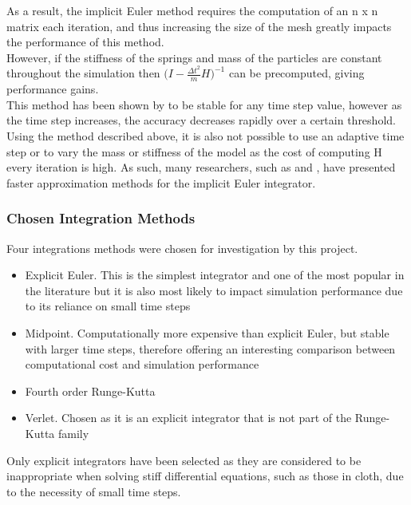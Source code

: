 As a result, the implicit Euler method requires the computation of an n x n matrix each iteration, and thus increasing the size of the mesh greatly impacts the performance of this method.
\\However, if the stiffness of the springs and mass of the particles are constant throughout the simulation then $\bigg(I - \frac{\Delta t^{2}}{m}H\bigg)^{-1}$ can be precomputed, giving performance gains.
\\This method has been shown by \textcite{Volino2001} to be stable for any time step value, however as the time step increases, the accuracy decreases rapidly over a certain threshold. Using the method described above, it is also not possible to use an adaptive time step or to vary the mass or stiffness of the model as the cost of computing H every iteration is high. As such, many researchers, such as \textcite{Mesit2007} and \textcite{Kang2000}, have presented faster approximation methods for the implicit Euler integrator.

\subsubsection{Chosen Integration Methods}
Four integrations methods were chosen for investigation by this project.
\begin{itemize}
\item{Explicit Euler. This is the simplest integrator and one of the most popular in the literature but it is also most likely to impact simulation performance due to its reliance on small time steps}
\item{Midpoint. Computationally more expensive than explicit Euler, but stable with larger time steps, therefore offering an interesting comparison between computational cost and simulation performance}
\item{Fourth order Runge-Kutta}
\item{Verlet. Chosen as it is an explicit integrator that is not part of the Runge-Kutta family}
\end{itemize}
Only explicit integrators have been selected as they are considered to be inappropriate when solving stiff differential equations, such as those in cloth, due to the necessity of small time steps.